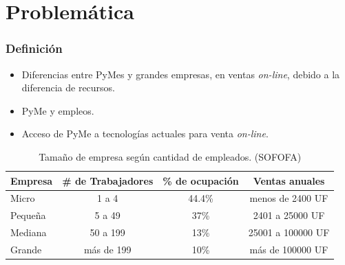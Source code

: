 \documentclass[10pt, compress]{beamer}
\begin{document}
\section{Problemática}
\begin{frame}
\frametitle{Definición}
        \begin{itemize}
          \item Diferencias entre PyMes y grandes empresas, en ventas \emph{on-line}, debido a la diferencia de recursos.
	  \item PyMe y empleos.
	  \item Acceso de PyMe a tecnologías actuales para venta \emph{on-line}.
        \end{itemize}

\begin{table}[h]
\footnotesize
\centering
\begin{tabular}{|l|c|c|c|}
\hline
{\bf Empresa}  & {\bf \# de Trabajadores} & {\bf \% de ocupación} & {\bf Ventas anuales}\\
\hline
Micro    & 1 a 4                & 44.4\%  & menos de 2400 UF\\
\hline
Pequeña  & 5 a 49               & 37\%  & 2401 a 25000 UF\\
\hline
Mediana  & 50 a 199             & 13\%  & 25001 a 100000 UF\\
\hline
Grande   & más de 199           & 10\%  & más de 100000 UF\\
\hline
\end{tabular}
\caption{Tamaño de empresa según cantidad de empleados. (SOFOFA)}
\label{tab:tam_empresa}
\end{table}
\end{frame}
\end{document}
